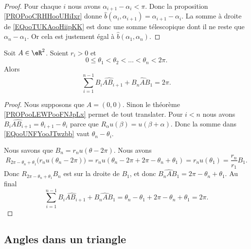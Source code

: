\begin{proof}
	Pour chaque \( i\) nous avons \( \alpha_{i+1}-\alpha_i<\pi\). Donc la proposition \ref{PROPooCRHHooUHiIxr} donne \( \hat b(\alpha_i,\alpha_{i+1})=\alpha_{i+1}-\alpha_i\). La somme à droite de \eqref{EQooTUKAooHiipKK} est donc une somme télescopique dont il ne reste que \( \alpha_n-\alpha_1\). Or cela est justement égal à \( \hat b(\alpha_1,\alpha_n)\).
\end{proof}


\begin{proposition}	\label{PROPooYWLEooIvbGGs}
	Soit \( A\in \eR^2\). Soient \( r_i>0\) et
	\begin{equation}
		0\leq \theta_1<\theta_2<\ldots<\theta_n<2\pi.
	\end{equation}
	Alors
	\begin{equation}		\label{EQooUNFYooJTwzbb}
		\sum_{i=1}^{n-1}\widehat{B_iAB_{i+1}}+\widehat{B_nAB_1}=2\pi.
	\end{equation}
\end{proposition}

\begin{proof}
	Nous supposons que \( A=(0,0)\). Sinon le théorème \ref{PROPooLEWPooFNJpLx} permet de tout translater. Pour \( i<n\) nous avons \( \widehat{B_iAB_{i+1}}=\theta_{i+1}-\theta_i\) parce que \( R_{\alpha}u(\beta)=u(\beta+\alpha)\). Donc la somme dans \eqref{EQooUNFYooJTwzbb} vaut \( \theta_n-\theta_i\).

	Nous savons que \( B_n=r_nu(\theta-2\pi)\). Nous avons
	\begin{equation}
		R_{2\pi-\theta_n+\theta_1}\big( r_nu(\theta_n-2\pi) \big)=r_nu(\theta_n-2\pi+2\pi-\theta_n+\theta_1)=r_nu(\theta_1)=\frac{ r_n }{ r_1 }B_1.
	\end{equation}
	Donc \( R_{2\pi-\theta_n+\theta_1}B_n\) est sur la droite de \( B_1\), et donc \( \widehat{B_nAB_1}=2\pi-\theta_n+\theta_1\). Au final
	\begin{equation}
		\sum_{i=1}^{n-1}\widehat{B_iAB_{i+1}}+\widehat{B_nAB_1}=\theta_n-\theta_1+2\pi-\theta_n+\theta_1=2\pi.
	\end{equation}
\end{proof}


\subsection{Angles dans un triangle}


